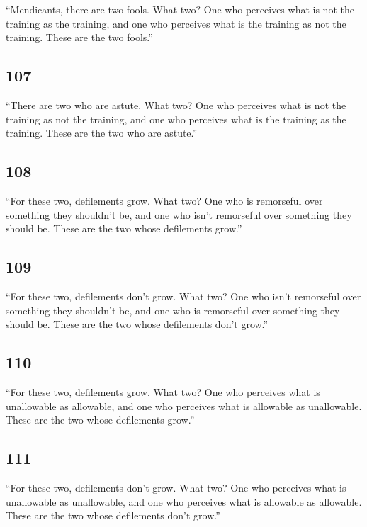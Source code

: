 \documentclass[12pt,openany]{book}%
\begin{document}
“Mendicants, there are two fools. What two? One who perceives what is not the training as the training, and one who perceives what is the training as not the training. These are the two fools.” 

\subsection*{107 }

“There are two who are astute. What two? One who perceives what is not the training as not the training, and one who perceives what is the training as the training. These are the two who are astute.” 

\subsection*{108 }

“For these two, defilements grow. What two? One who is remorseful over something they shouldn’t be, and one who isn’t remorseful over something they should be. These are the two whose defilements grow.” 

\subsection*{109 }

“For these two, defilements don’t grow. What two? One who isn’t remorseful over something they shouldn’t be, and one who is remorseful over something they should be. These are the two whose defilements don’t grow.” 

\subsection*{110 }

“For these two, defilements grow. What two? One who perceives what is unallowable as allowable, and one who perceives what is allowable as unallowable. These are the two whose defilements grow.” 

\subsection*{111 }

“For these two, defilements don’t grow. What two? One who perceives what is unallowable as unallowable, and one who perceives what is allowable as allowable. These are the two whose defilements don’t grow.” 
\end{document}
